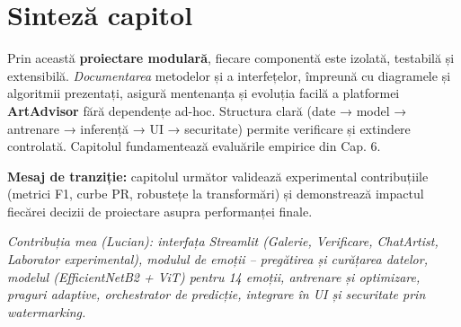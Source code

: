 \bigskip
\section{Sinteză capitol}\label{sec:c5-sinteza}
Prin această \textbf{proiectare modulară}, fiecare componentă este izolată, testabilă și extensibilă. \emph{Documentarea} metodelor și a interfețelor, împreună cu diagramele și algoritmii prezentați, asigură mentenanța și evoluția facilă a platformei \textbf{ArtAdvisor} fără dependențe ad-hoc. Structura clară (date → model → antrenare → inferență → UI → securitate) permite verificare și extindere controlată. Capitolul fundamentează evaluările empirice din Cap. 6.

\medskip
\noindent
\textbf{Mesaj de tranziție:} capitolul următor validează experimental contribuțiile (metrici F1, curbe PR, robustețe la transformări) și demonstrează impactul fiecărei decizii de proiectare asupra performanței finale.

\bigskip
\noindent\textit{Contribuția mea (Lucian): interfața Streamlit (Galerie, Verificare, ChatArtist, Laborator experimental), modulul de emoții – pregătirea și curățarea datelor, modelul (EfficientNetB2 + ViT) pentru 14 emoții, antrenare și optimizare, praguri adaptive, orchestrator de predicție, integrare în UI și securitate prin watermarking.}
